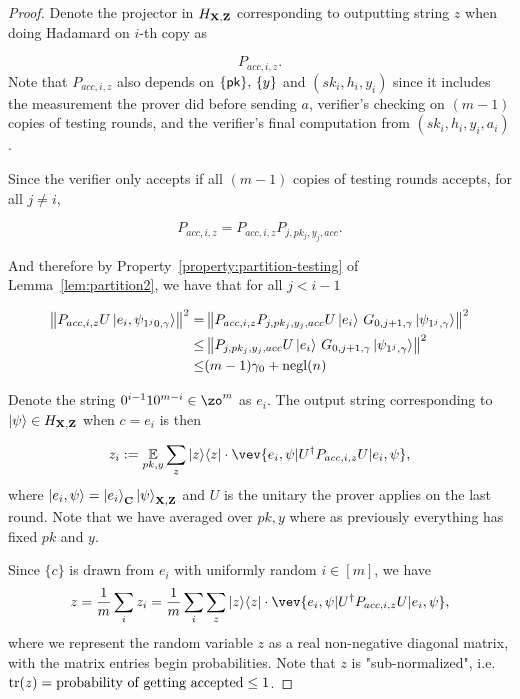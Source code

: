 \begin{proof}
Denote the projector in $H_{\mathbf{X},\mathbf{Z}}$ corresponding to outputting string $z$ when doing Hadamard on $i$-th copy as

$$P_{acc,i,z}.$$
Note that $P_{acc,i,z}$ also depends on $\{\mathsf{pk}\},\,\{y\}$ and  $(sk_i,h_i,y_i)$ since it includes the measurement the prover did before sending $a$,  verifier's checking on $(m-1)$ copies of testing rounds, and  the verifier's final computation from $(sk_i,h_i,y_i,a_i)$.

Since the verifier only accepts if all $(m-1)$ copies of testing rounds accepts, for all $j\neq i$,

$$P_{acc,i,z}=P_{acc,i,z}P_{j,pk_j,y_j,acc}.$$

And therefore by Property~\ref{property:partition-testing} of Lemma~\ref{lem:partition2}, we have that for all $j <i-1$

\begin{align} \label{eq:rejected-d}
    \left\lVert P_{acc,i,z} U \ket{e_i, \psi_{1^j0,\gamma}}\right\rVert^2
    =& \left\lVert P_{acc,i,z}P_{j,pk_j,y_j,acc} U \ket{e_i}\, G_{0,j+1,\gamma}\ket{\psi_{1^j,\gamma}}  \right\rVert^2 \nonumber \\
    \leq& \left\lVert P_{j,pk_j,y_j,acc} U \ket{e_i}\, G_{0,j+1,\gamma}\ket{\psi_{1^j,\gamma}}  \right\rVert^2 \nonumber \\
    \leq& (m-1)\gamma_0+\operatorname{negl}(n) 
\end{align}


Denote the string $0^{i-1}10^{m-i} \in \zo^m $ as $e_i$. The output string corresponding to $\ket{\psi} \in H_{\mathbf{X},\mathbf{Z}}$ when $c=e_i$ is then 




$$z_i\defeq \E_{pk,y} \sum_z \proj{z} \cdot \vev{e_i,\psi|U^\dag P_{acc,i,z} U|e_i,\psi},$$
where $\ket{e_i,\psi}=\ket{e_i}_{\mathbf{C}}\ket{\psi}_{\mathbf{X},\mathbf{Z}}$ and $U$ is the unitary the prover applies on the last round. Note that we have averaged over $pk, y$ where as previously everything has fixed $pk$ and $y$. 

Since $\{c\}$ is drawn  from $e_i$ with uniformly random $i\in [m]$, we have 
$$ z=\frac{1}{m} \sum_i z_i= \frac{1}{m} \sum_i \sum_z \proj{z} \cdot \vev{e_i,\psi|U^\dag P_{acc,i,z} U|e_i,\psi},$$ 
	where we represent the random variable $z$ as a real non-negative diagonal matrix, with the matrix entries begin probabilities. Note that $z$ is "sub-normalized", i.e. $\operatorname{tr} (z)= \text{probability of getting accepted} \leq 1$.







\end{proof}
